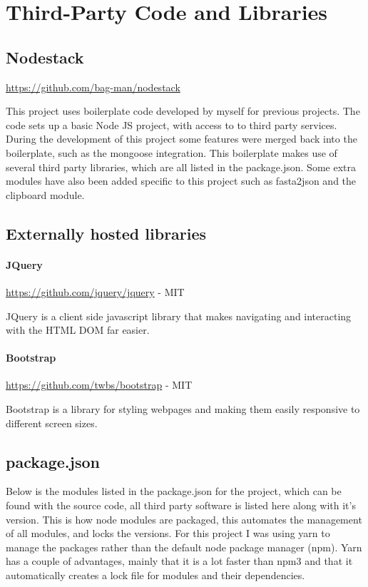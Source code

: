 \chapter{Third-Party Code and Libraries}
\section{Nodestack}

\url{https://github.com/bag-man/nodestack}

This project uses boilerplate code developed by myself for previous projects. The code sets up a basic Node JS project, with access to to third party services. During the development of this project some features were merged back into the boilerplate, such as the mongoose integration.  This boilerplate makes use of several third party libraries, which are all listed in the package.json. Some extra modules have also been added specific to this project such as fasta2json and the clipboard module. 

\section{Externally hosted libraries}
\subsubsection*{JQuery} 

\url{https://github.com/jquery/jquery} - MIT

JQuery is a client side javascript library that makes navigating and interacting with the HTML DOM far easier. 

\subsubsection*{Bootstrap} 

\url{https://github.com/twbs/bootstrap} - MIT

Bootstrap is a library for styling webpages and making them easily responsive to different screen sizes.

\section{package.json}
Below is the modules listed in the package.json for the project, which can be found with the source code, all third party software is listed here along with it's version. This is how node modules are packaged, this automates the management of all modules, and locks the versions. For this project I was using yarn\cite{yarn} to manage the packages rather than the default node package manager (npm)\cite{npm}. Yarn has a couple of advantages, mainly that it is a lot faster than npm3 and that it automatically creates a lock file for modules and their dependencies. 

